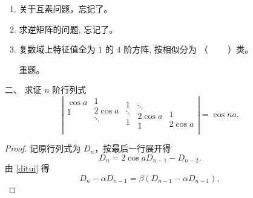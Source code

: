 \begin{enumerate}[1~]
\begin{enumerate}[1.~]
\item
关于互素问题，忘记了。
\item
求逆矩阵的问题, 忘记了。
\item
复数域上特征值全为 $1$ 的 $4$ 阶方阵, 按相似分为 （ \ \ \ \ ）类。
\begin{solution}
重题。
\end{solution}
\end{enumerate}

\item[二、]
求证 $n$ 阶行列式
\[\left| \begin{array}{c}
	\cos a\\
	1\\
	\\
	\\
	\\
\end{array}\begin{array}{c}
	1\\
	2\cos a\\
	\ddots\\
	\\
	\\
\end{array}\begin{array}{c}
	\\
	1\\
	\ddots\\
	1\\
	\\
\end{array}\begin{array}{c}
	\\
	\\
	\ddots\\
	2\cos a\\
	1\\
\end{array}\begin{array}{c}
	\\
	\\
	\\
	1\\
	2\cos a\\
\end{array} \right|=\cos na.
\]
\begin{proof}
记原行列式为 $D_n$，按最后一行展开得
\begin{equation}\label{ditui}
D_n=2\cos a D_{n-1} - D_{n-2}.
\end{equation}
由 \eqref{ditui} 得
\begin{equation}\label{alpha1}
D_n - \alpha D_{n-1} = \beta (D_{n-1} - \alpha D_{n-1}),

\end{equation}
\end{proof}
\end{enumerate}
